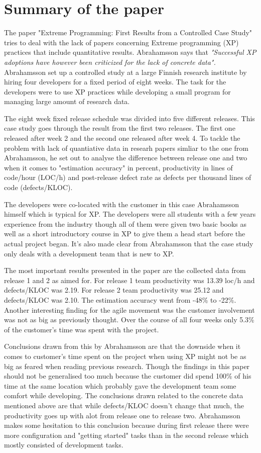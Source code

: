 \newpage
\section{Summary of the paper}
The paper "Extreme Programming: First Results from a Controlled Case Study"
\cite{abrahamsson2003} tries to deal with the lack of papers concerning Extreme
programming (XP) practices that include quantitative results. Abrahamsson says that
{\em "Successful XP adoptions have however been criticized for the lack of
concrete data".} Abrahamsson set up a controlled study at a large Finnish
research institute by hiring four developers for a fixed period of eight weeks.
The task for the developers were to use XP practices while developing a small
program for managing large amount of research data.

The eight week fixed release schedule was divided into five different releases.
This case study goes through the result from the first two releases. The first
one released after week 2 and the second one released after week 4. To tackle
the problem with lack of quantiative data in researh papers simliar to the one
from Abrahamsson, he set out to analyse the difference between release one and
two when it comes to "estimation accuracy" in percent, productivity in lines of
code/hour (LOC/h) and post-release defect rate as defects per thousand lines of
code (defects/KLOC).

The developers were co-located with the customer in this case Abrahamsson
himself which is typical for XP. The developers were all students with a few
years experience from the industry though all of them were given two basic
books as well as a short introductory course in XP to give them a head start
before the actual project began. It's also made clear from Abrahamsson that
the case study only deals with a development team that is new to XP.

The most important results presented in the paper are the collected data from
release 1 and 2 as aimed for. For release 1 team productivity was 13.39
loc/h and defects/KLOC was 2.19. For release 2 team productivity was 25.12 and
defects/KLOC was 2.10. The estimation accuracy went from -48\% to
-22\%. Another interesting finding for the agile movement was the customer
involvement was not as big as previously thought. Over the course
of all four weeks only 5.3\% of the customer's time was spent with the project.

Conclusions drawn from this by Abrahamsson are that the downside when it comes
to customer's time spent on the project when using XP might not be as big as
feared when reading previous research. Though the findings in this paper should
not be generalised too much because the customer did spend 100\% of his time at
the same location which probably gave the development team some comfort while
developing. The conclusions drawn related to the concrete data mentioned above
are that while defects/KLOC doesn't change that much, the productivity goes up
with alot from release one to release two. Abrahamsson makes some hesitation
to this conclusion because during first release there were more
configuration and "getting started" tasks than in the second release which
mostly consisted of development tasks.

